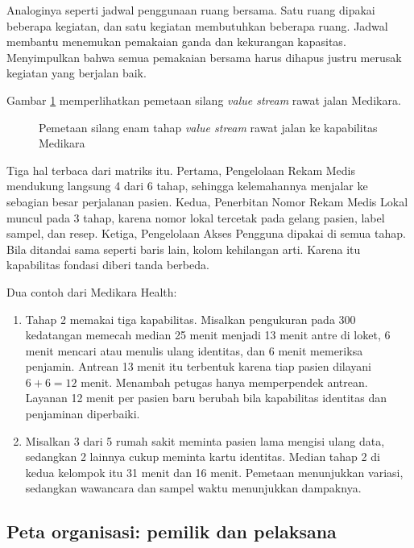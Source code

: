 Analoginya seperti jadwal penggunaan ruang bersama. Satu ruang dipakai beberapa kegiatan, dan satu
kegiatan membutuhkan beberapa ruang. Jadwal membantu menemukan pemakaian ganda dan kekurangan
kapasitas. Menyimpulkan bahwa semua pemakaian bersama harus dihapus justru merusak kegiatan yang
berjalan baik.

Gambar \ref{fig:ch05-pemetaan-silang} memperlihatkan pemetaan silang \textit{value stream} rawat
jalan Medikara.

\begin{figure}[!htb]
  \centering
  
  \caption{Pemetaan silang enam tahap \textit{value stream} rawat jalan ke kapabilitas Medikara}
  \label{fig:ch05-pemetaan-silang}
\end{figure}

Tiga hal terbaca dari matriks itu. Pertama, Pengelolaan Rekam Medis mendukung langsung 4 dari 6
tahap, sehingga kelemahannya menjalar ke sebagian besar perjalanan pasien. Kedua, Penerbitan Nomor
Rekam Medis Lokal muncul pada 3 tahap, karena nomor lokal tercetak pada gelang pasien, label
sampel, dan resep. Ketiga, Pengelolaan Akses Pengguna dipakai di semua tahap. Bila ditandai sama
seperti baris lain, kolom kehilangan arti. Karena itu kapabilitas fondasi diberi tanda berbeda.

Dua contoh dari Medikara Health:

\begin{enumerate}
  \item Tahap 2 memakai tiga kapabilitas. Misalkan pengukuran pada 300 kedatangan memecah median
        25 menit menjadi 13 menit antre di loket, 6 menit mencari atau menulis ulang identitas,
        dan 6 menit memeriksa penjamin. Antrean 13 menit itu terbentuk karena tiap pasien dilayani
        $6 + 6 = 12$ menit. Menambah petugas hanya memperpendek antrean. Layanan 12 menit per pasien
        baru berubah bila kapabilitas identitas dan penjaminan diperbaiki.
  \item Misalkan 3 dari 5 rumah sakit meminta pasien lama mengisi ulang data, sedangkan 2 lainnya
        cukup meminta kartu identitas. Median tahap 2 di kedua kelompok itu 31 menit dan 16 menit.
        Pemetaan menunjukkan variasi, sedangkan wawancara dan sampel waktu menunjukkan dampaknya.
\end{enumerate}

\subsection*{Peta organisasi: pemilik dan pelaksana}

